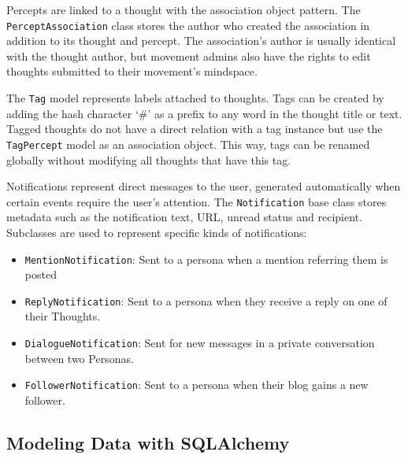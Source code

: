 Percepts are linked to a thought with the association object pattern.
The \texttt{PerceptAssociation} class stores the author who created the
association in addition to its thought and percept. The association's
author is usually identical with the thought author, but movement admins
also have the rights to edit thoughts submitted to their movement's
mindspace.


The \texttt{Tag} model represents labels attached to thoughts. Tags can
be created by adding the hash character `\#' as a prefix to any word in
the thought title or text. Tagged thoughts do not have a direct relation
with a tag instance but use the \texttt{TagPercept} model as an
association object. This way, tags can be renamed globally without
modifying all thoughts that have this tag.


Notifications represent direct messages to the user, generated
automatically when certain events require the user's attention. The
\texttt{Notification} base class stores metadata such as the
notification text, URL, unread status and recipient. Subclasses are used
to represent specific kinds of notifications:

\begin{itemize}
\tightlist
\item
  \texttt{MentionNotification}: Sent to a persona when a mention
  referring them is posted
\item
  \texttt{ReplyNotification}: Sent to a persona when they receive a
  reply on one of their Thoughts.
\item
  \texttt{DialogueNotification}: Sent for new messages in a private
  conversation between two Personas.
\item
  \texttt{FollowerNotification}: Sent to a persona when their blog gains
  a new follower.
\end{itemize}

\subsection{Modeling Data with
SQLAlchemy}\label{modeling-data-with-sqlalchemy}

